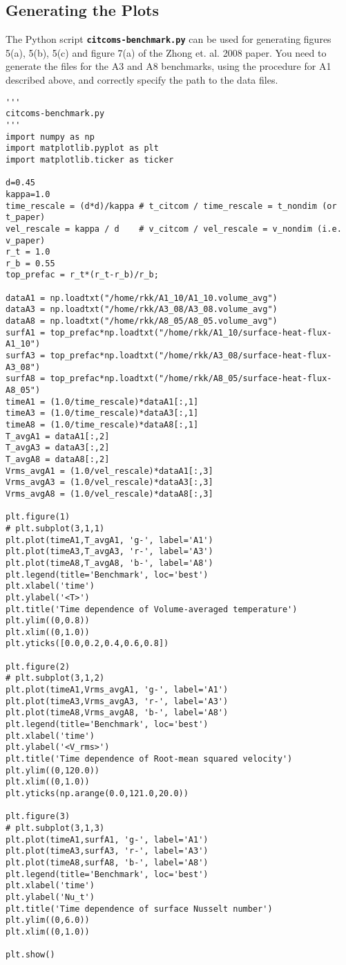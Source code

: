 \documentclass[10pt]{article}
\begin{document}
\subsection*{Generating the Plots}
The Python script \textbf{\texttt{citcoms-benchmark.py}} can be used for generating figures 5(a), 5(b), 5(c) and
figure 7(a) of the Zhong et. al. 2008 paper. You need to generate the files for the A3 and A8 benchmarks, using the
procedure for A1 described above, and correctly specify the path to the data files.

\begin{verbatim}
'''
citcoms-benchmark.py
'''
import numpy as np
import matplotlib.pyplot as plt
import matplotlib.ticker as ticker

d=0.45
kappa=1.0
time_rescale = (d*d)/kappa # t_citcom / time_rescale = t_nondim (or t_paper) 
vel_rescale = kappa / d    # v_citcom / vel_rescale = v_nondim (i.e. v_paper)
r_t = 1.0
r_b = 0.55
top_prefac = r_t*(r_t-r_b)/r_b;

dataA1 = np.loadtxt("/home/rkk/A1_10/A1_10.volume_avg")
dataA3 = np.loadtxt("/home/rkk/A3_08/A3_08.volume_avg")
dataA8 = np.loadtxt("/home/rkk/A8_05/A8_05.volume_avg")
surfA1 = top_prefac*np.loadtxt("/home/rkk/A1_10/surface-heat-flux-A1_10")
surfA3 = top_prefac*np.loadtxt("/home/rkk/A3_08/surface-heat-flux-A3_08")
surfA8 = top_prefac*np.loadtxt("/home/rkk/A8_05/surface-heat-flux-A8_05")
timeA1 = (1.0/time_rescale)*dataA1[:,1]
timeA3 = (1.0/time_rescale)*dataA3[:,1]
timeA8 = (1.0/time_rescale)*dataA8[:,1]
T_avgA1 = dataA1[:,2]
T_avgA3 = dataA3[:,2]
T_avgA8 = dataA8[:,2]
Vrms_avgA1 = (1.0/vel_rescale)*dataA1[:,3]
Vrms_avgA3 = (1.0/vel_rescale)*dataA3[:,3]
Vrms_avgA8 = (1.0/vel_rescale)*dataA8[:,3]

plt.figure(1)
# plt.subplot(3,1,1)
plt.plot(timeA1,T_avgA1, 'g-', label='A1')
plt.plot(timeA3,T_avgA3, 'r-', label='A3')
plt.plot(timeA8,T_avgA8, 'b-', label='A8')
plt.legend(title='Benchmark', loc='best')
plt.xlabel('time')
plt.ylabel('<T>')
plt.title('Time dependence of Volume-averaged temperature')
plt.ylim((0,0.8))
plt.xlim((0,1.0))
plt.yticks([0.0,0.2,0.4,0.6,0.8])

plt.figure(2)
# plt.subplot(3,1,2)
plt.plot(timeA1,Vrms_avgA1, 'g-', label='A1')
plt.plot(timeA3,Vrms_avgA3, 'r-', label='A3')
plt.plot(timeA8,Vrms_avgA8, 'b-', label='A8')
plt.legend(title='Benchmark', loc='best')
plt.xlabel('time')
plt.ylabel('<V_rms>')
plt.title('Time dependence of Root-mean squared velocity')
plt.ylim((0,120.0))
plt.xlim((0,1.0))
plt.yticks(np.arange(0.0,121.0,20.0))

plt.figure(3)
# plt.subplot(3,1,3)
plt.plot(timeA1,surfA1, 'g-', label='A1')
plt.plot(timeA3,surfA3, 'r-', label='A3')
plt.plot(timeA8,surfA8, 'b-', label='A8')
plt.legend(title='Benchmark', loc='best')
plt.xlabel('time')
plt.ylabel('Nu_t')
plt.title('Time dependence of surface Nusselt number')
plt.ylim((0,6.0))
plt.xlim((0,1.0))

plt.show()
\end{verbatim}
\end{document}
